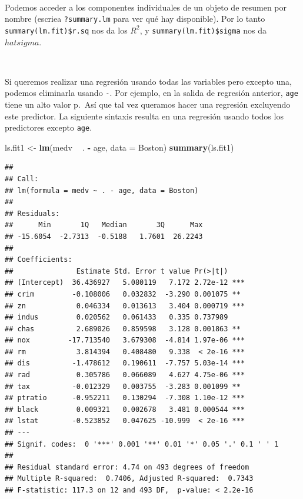 \documentclass[]{book}
\newenvironment{Shaded}{\begin{snugshade}}{\end{snugshade}}
\newcommand{\KeywordTok}[1]{\textcolor[rgb]{0.13,0.29,0.53}{\textbf{#1}}}
\newcommand{\DataTypeTok}[1]{\textcolor[rgb]{0.13,0.29,0.53}{#1}}
\newcommand{\StringTok}[1]{\textcolor[rgb]{0.31,0.60,0.02}{#1}}
\newcommand{\OperatorTok}[1]{\textcolor[rgb]{0.81,0.36,0.00}{\textbf{#1}}}
\newcommand{\NormalTok}[1]{#1}
\begin{document}
~

Podemos acceder a los componentes individuales de un objeto de resumen
por nombre (escriea \texttt{?summary.lm} para ver qué hay disponible).
Por lo tanto \texttt{summary(lm.fit)\$r.sq} nos da los \(R^2\), y
\texttt{summary(lm.fit)\$sigma} nos da \(hat{sigma}\).

~

Si queremos realizar una regresión usando todas las variables pero
excepto una, podemos eliminarla usando \texttt{-}. Por ejemplo, en la
salida de regresión anterior, \texttt{age} tiene un alto valor p.~Así
que tal vez queramos hacer una regresión excluyendo este predictor. La
siguiente sintaxis resulta en una regresión usando todos los predictores
excepto \texttt{age}.

\begin{Shaded}
\begin{Highlighting}[]
\NormalTok{ls.fit1 <-}\StringTok{ }\KeywordTok{lm}\NormalTok{(medv }\OperatorTok{~}\StringTok{ }\NormalTok{. }\OperatorTok{-}\StringTok{ }\NormalTok{age, }\DataTypeTok{data =}\NormalTok{ Boston)}
\KeywordTok{summary}\NormalTok{(ls.fit1)}
\end{Highlighting}
\end{Shaded}

\begin{verbatim}
## 
## Call:
## lm(formula = medv ~ . - age, data = Boston)
## 
## Residuals:
##      Min       1Q   Median       3Q      Max 
## -15.6054  -2.7313  -0.5188   1.7601  26.2243 
## 
## Coefficients:
##               Estimate Std. Error t value Pr(>|t|)    
## (Intercept)  36.436927   5.080119   7.172 2.72e-12 ***
## crim         -0.108006   0.032832  -3.290 0.001075 ** 
## zn            0.046334   0.013613   3.404 0.000719 ***
## indus         0.020562   0.061433   0.335 0.737989    
## chas          2.689026   0.859598   3.128 0.001863 ** 
## nox         -17.713540   3.679308  -4.814 1.97e-06 ***
## rm            3.814394   0.408480   9.338  < 2e-16 ***
## dis          -1.478612   0.190611  -7.757 5.03e-14 ***
## rad           0.305786   0.066089   4.627 4.75e-06 ***
## tax          -0.012329   0.003755  -3.283 0.001099 ** 
## ptratio      -0.952211   0.130294  -7.308 1.10e-12 ***
## black         0.009321   0.002678   3.481 0.000544 ***
## lstat        -0.523852   0.047625 -10.999  < 2e-16 ***
## ---
## Signif. codes:  0 '***' 0.001 '**' 0.01 '*' 0.05 '.' 0.1 ' ' 1
## 
## Residual standard error: 4.74 on 493 degrees of freedom
## Multiple R-squared:  0.7406, Adjusted R-squared:  0.7343 
## F-statistic: 117.3 on 12 and 493 DF,  p-value: < 2.2e-16
\end{verbatim}
\end{document}
